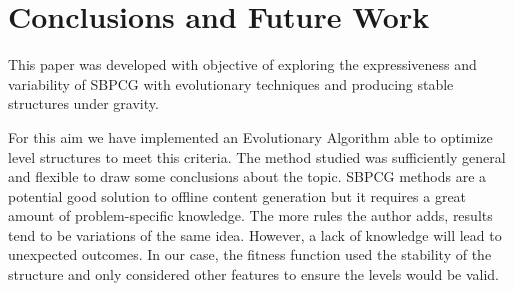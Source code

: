 \documentclass[sigconf]{acmart}
\begin{document}
\section{Conclusions and Future Work} 
\label{sec:conclusions}


This paper was developed with
objective of exploring the expressiveness and variability of 
SBPCG with evolutionary techniques
and producing stable structures under gravity.

For this aim we have implemented an Evolutionary Algorithm able to optimize 
level structures to meet this criteria. %
The method studied was
sufficiently general and flexible to draw some conclusions about the
topic. SBPCG methods are a potential good solution to offline content
generation but it requires a great amount of problem-specific
knowledge. 
The more rules the author adds, results tend to be 
variations of the same idea. However, %
a lack of knowledge
will lead to unexpected outcomes.
In our case, the fitness function used the 
stability of the structure and only considered other features %
to ensure the levels would be valid.
\end{document}
